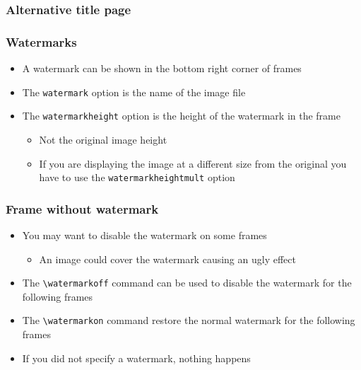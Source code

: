 \begin{frame}[t,fragile]
\frametitle{Alternative title page}
\end{frame}

\begin{frame}[t,fragile]
\frametitle{Watermarks}
\begin{itemize}
\item A watermark can be shown in the bottom right corner of frames
\item The \verb!watermark! option is the name of the image file
\item The \verb!watermarkheight! option is the height of the watermark in the frame
  \begin{itemize}
  \item Not the original image height
  \item If you are displaying the image at a different size from the original you
        have to use the \verb!watermarkheightmult! option
  \end{itemize}
\end{itemize}

\end{frame}

\watermarkoff
\begin{frame}[t,fragile]
\frametitle{Frame without watermark}

\begin{itemize}
\item You may want to disable the watermark on some frames
  \begin{itemize}
  \item An image could cover the watermark causing an ugly effect
  \end{itemize}
\item The \verb!\watermarkoff! command can be used to disable the watermark for the following frames
\item The \verb!\watermarkon! command restore the normal watermark for the following frames
\item If you did not specify a watermark, nothing happens
\end{itemize}

\end{frame}
\watermarkon
